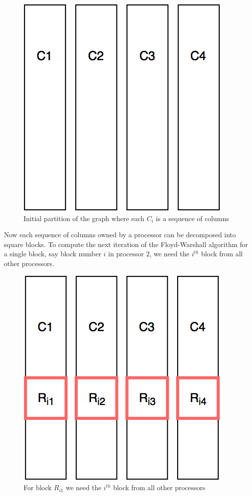\documentclass[11pt]{article}
\begin{document}
\begin{figure}[H]
\centering
\includegraphics[scale=0.2]{initial_partition.png}
\caption{Initial partition of the graph where each $C_i$ is a sequence of columns}
\label{fig:init_part}
\end{figure}

Now each sequence of columns owned by a processor can be decomposed into square blocks. To compute the next iteration of the Floyd-Warshall algorithm for a single block, say block number $i$ in processor $2$, we need the $i^{th}$ block from all other processors.

\begin{figure}[H]
\centering
\includegraphics[scale=0.2]{allgather.png}
\caption{For block $R_{i1}$ we need the $i^{th}$ block from all other processors}
\label{fig:allgather}
\end{figure}
\end{document}

